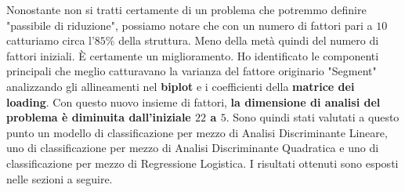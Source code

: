 \documentclass[11pt,a4paper]{article}
\begin{document}
\noindent Nonostante non si tratti certamente di un problema che potremmo
definire "passibile di riduzione", possiamo notare che con un numero di fattori
pari a $10$ catturiamo circa l'$85\%$ della struttura. Meno della met\`a quindi
del numero di fattori iniziali. \`E certamente un miglioramento. Ho identificato
le componenti principali che meglio catturavano la varianza del fattore
originario "Segment" analizzando gli allineamenti nel \textbf{biplot} e i
coefficienti della \textbf{matrice dei loading}. Con questo nuovo insieme di
fattori, \textbf{la dimensione di analisi del problema \`e diminuita
dall'iniziale $22$ a $5$}. Sono quindi stati valutati a questo punto un modello
di classificazione per mezzo di Analisi Discriminante Lineare, uno di
classificazione per mezzo di Analisi Discriminante Quadratica e uno di
classificazione per mezzo di Regressione Logistica. I risultati ottenuti sono
esposti nelle sezioni a seguire.
\end{document}
